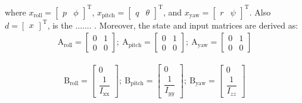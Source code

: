 \documentclass[conference]{IEEEtran}
\begin{document}
where $x_{\text{roll}} = \begin{bmatrix}
	p & \phi
\end{bmatrix}^\mathrm{T}$, $x_{\text{pitch}} = \begin{bmatrix}
	q & \theta \end{bmatrix}^\mathrm{T}$, and $x_{\text{yaw}} = \begin{bmatrix}
	r & \psi
\end{bmatrix}^\mathrm{T}$.
Also $d = \begin{bmatrix}
	x
\end{bmatrix}^\mathrm{T}$, is the ....... .
Moreover, the state and input matrices are derived as:
\begin{equation}
	\begin{split}
		\boldsymbol{\mathrm{A}}_{\text{roll}}  = \begin{bmatrix}
			0 & 1
			\\
			0 & 0
		\end{bmatrix};~ \boldsymbol{\mathrm{A}}_{\text{pitch}}  = \begin{bmatrix}
			0 & 1\\
			0 & 0
		\end{bmatrix};~ \boldsymbol{\mathrm{A}}_{\text{yaw}}  = \begin{bmatrix}
			0 & 1\\
			0 & 0
		\end{bmatrix}
	\end{split}
\end{equation}

\begin{equation}
	\begin{split}
		\boldsymbol{\mathrm{B}}_{\text{roll}}  = \begin{bmatrix}
			0
			\\[1em]
			\dfrac{1}{I_{\text{xx}}}
		\end{bmatrix};~ \boldsymbol{\mathrm{B}}_{\text{pitch}}  = \begin{bmatrix}
			0
			\\[1em]
			\dfrac{1}{I_{yy}}
		\end{bmatrix};~ \boldsymbol{\mathrm{B}}_{\text{yaw}}  = \begin{bmatrix}
			0
			\\[1em]
			\dfrac{1}{I_{zz}}
		\end{bmatrix}
	\end{split}
\end{equation}
\end{document}
